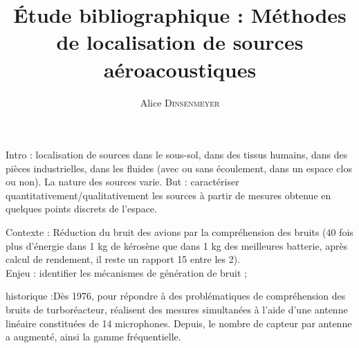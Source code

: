 \documentclass[twocolumn]{article}
\title{
\centering \fontsize{18pt}{10pt}\textbf{Étude bibliographique : Méthodes de localisation de sources aéroacoustiques}
}
\author{
\large{Alice \textsc{Dinsenmeyer}}\\[2mm] %
\vspace{-5mm}
}
\date{}
\begin{document}
\maketitle %

\thispagestyle{fancy} %




Intro : localisation de sources dans le sous-sol, dans des tissus humains, dans des pièces industrielles, dans les fluides (avec ou sans écoulement, dans un espace clos ou non). La nature des sources varie.
But : caractériser quantitativement/qualitativement les sources à partir de mesures obtenue en quelques points  discrets de l'espace.

Contexte : Réduction du bruit des avions par la compréhension des bruits (40 fois plus d'énergie dans 1 kg de kérosène que dans 1 kg des meilleures batterie, après calcul de rendement, il reste un rapport 15 entre les 2).\\
Enjeu : identifier les mécanismes de génération de bruit ; 

historique :Dès 1976, pour répondre à des problématiques de compréhension des bruits de turboréacteur, \cite{Billingsley1976} réalisent des mesures simultanées à l'aide d'une antenne linéaire constituées de 14 microphones. 
Depuis, le nombre de capteur par antenne a augmenté, ainsi la gamme fréquentielle.



\end{document}
